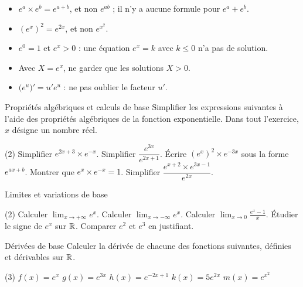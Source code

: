 \begin{attention}
\begin{itemize}[label={\color{otOrange}\textbullet},leftmargin=1.4em,itemsep=0.6mm,topsep=0.5mm]
  \item $e^{a}\times e^{b}=e^{a+b}$, et non $e^{ab}$ ; il n'y a aucune formule pour $e^{a}+e^{b}$.
  \item $\left(e^{x}\right)^{2}=e^{2x}$, et non $e^{x^{2}}$.
  \item $e^{0}=1$ et $e^{x}>0$ : une équation $e^{x}=k$ avec $k\leq0$ n'a pas de solution.
  \item Avec $X=e^{x}$, ne garder que les solutions $X>0$.
  \item $\big(e^{u}\big)'=u'e^{u}$ : ne pas oublier le facteur $u'$.
\end{itemize}
\end{attention}

\exercices
{}

\begin{exercice}[1]{Propriétés algébriques et calculs de base}
Simplifier les expressions suivantes à l'aide des propriétés algébriques de la fonction exponentielle. Dans tout l'exercice, $x$ désigne un nombre réel.
\begin{tasks}(2)
  \task Simplifier $e^{2x+3}\times e^{-x}$.
  \task Simplifier $\dfrac{e^{3x}}{e^{2x+1}}$.
  \task Écrire $(e^{x})^{2}\times e^{-3x}$ sous la forme $e^{ax+b}$.
  \task Montrer que $e^{x}\times e^{-x}=1$.
  \task Simplifier $\dfrac{e^{x+2}\times e^{3x-1}}{e^{2x}}$.
\end{tasks}
\end{exercice}

\begin{exercice}[1]{Limites et variations de base}
\begin{tasks}(2)
  \task Calculer $\displaystyle\lim_{x\to+\infty}e^{x}$.
  \task Calculer $\displaystyle\lim_{x\to-\infty}e^{x}$.
  \task Calculer $\displaystyle\lim_{x\to0}\frac{e^{x}-1}{x}$.
  \task Étudier le signe de $e^{x}$ sur $\mathbb{R}$.
  \task Comparer $e^{2}$ et $e^{3}$ en justifiant.
\end{tasks}
\end{exercice}

\begin{exercice}[1]{Dérivées de base}
Calculer la dérivée de chacune des fonctions suivantes, définies et dérivables sur $\mathbb{R}$.
\begin{tasks}(3)
  \task $f(x)=e^{x}$
  \task $g(x)=e^{3x}$
  \task $h(x)=e^{-2x+1}$
  \task $k(x)=5e^{2x}$
  \task $m(x)=e^{x^{2}}$
\end{tasks}
\end{exercice}

